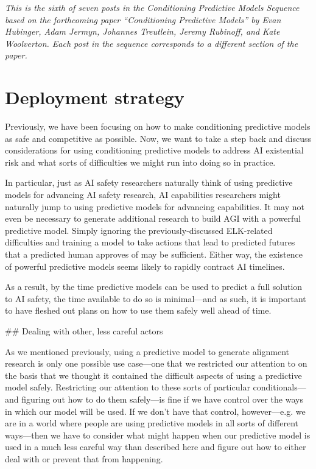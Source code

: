 {{\textit{This is the sixth of seven posts in the Conditioning Predictive Models Sequence based on the forthcoming paper ``Conditioning Predictive Models'' by Evan Hubinger, Adam Jermyn, Johannes Treutlein, Jeremy Rubinoff, and Kate Woolverton. Each post in the sequence corresponds to a different section of the paper.}

\section{Deployment strategy}
\label{sec:6}

Previously, we have been focusing on how to make conditioning predictive models as safe and competitive as possible. Now, we want to take a step back and discuss considerations for using conditioning predictive models to address AI existential risk and what sorts of difficulties we might run into doing so in practice.

In particular, just as AI safety researchers naturally think of using predictive models for advancing AI safety research, AI capabilities researchers might naturally jump to using predictive models for advancing capabilities. It may not even be necessary to generate additional research to build AGI with a powerful predictive model. Simply ignoring the previously-discussed ELK-related difficulties\cite{TODO: cite TODO} and training a model to take actions that lead to predicted futures that a predicted human approves of may be sufficient. Either way, the existence of powerful predictive models seems likely to rapidly contract AI timelines.

As a result, by the time predictive models can be used to predict a full solution to AI safety, the time available to do so is minimal---and as such, it is important to have fleshed out plans on how to use them safely well ahead of time.


## Dealing with other, less careful actors

As we mentioned previously, using a predictive model to generate alignment research is only one possible use case---one that we restricted our attention to on the basis that we thought it contained the difficult aspects of using a predictive model safely. Restricting our attention to these sorts of particular conditionals---and figuring out how to do them safely---is fine if we have control over the ways in which our model will be used. If we don't have that control, however---e.g. we are in a world where people are using predictive models in all sorts of different ways---then we have to consider what might happen when our predictive model is used in a much less careful way than described here and figure out how to either deal with or prevent that from happening.

}}
